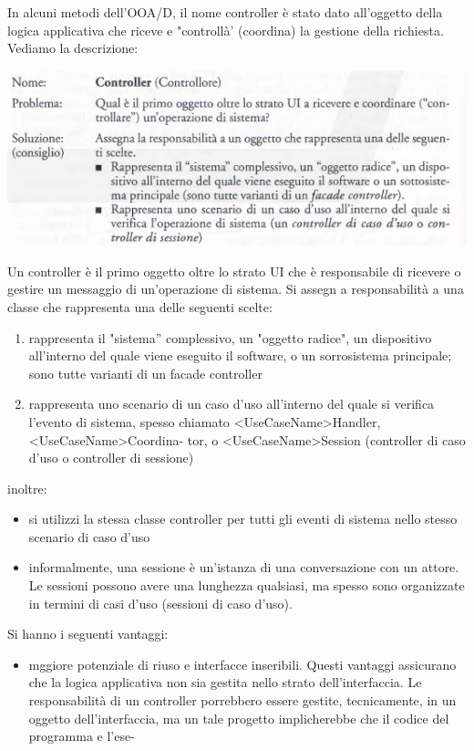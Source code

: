 \documentclass[a4paper,12pt, oneside]{book}
\begin{document}
\begin{enumerate}
In alcuni metodi dell'OOA/D, il nome controller è stato dato all'oggetto della logica
applicativa che riceve e "controllà' (coordina) la gestione della richiesta. Vediamo la descrizione:
\begin{center}
\includegraphics[scale = 0.7]{img/grasp11.png}
\end{center}
Un controller è il primo oggetto oltre lo strato UI che è responsabile di ricevere o gestire
un messaggio di un'operazione di sistema. Si assegn a responsabilità a una classe che rappresenta una delle seguenti scelte:
\begin{enumerate}
\item rappresenta il "sistema'' complessivo, un "oggetto radice", un dispositivo all'interno del quale viene eseguito il software, o un sorrosistema principale; sono tutte
varianti di un facade controller
\item rappresenta uno scenario di un caso d'uso all'interno del quale si verifica l'evento
di sistema, spesso chiamato <UseCaseName>Handler, <UseCaseName>Coordina-
tor, o <UseCaseName>Session (controller di caso d'uso o controller di sessione) 
\end{enumerate}
inoltre:
\begin{itemize}
\item si utilizzi la stessa classe controller per tutti gli eventi di sistema nello stesso
scenario di caso d'uso
\item informalmente, una sessione è un'istanza di una conversazione con un attore.
Le sessioni possono avere una lunghezza qualsiasi, ma spesso sono organizzate in
termini di casi d'uso (sessioni di caso d'uso).
\end{itemize}
Si hanno i seguenti vantaggi:
\begin{itemize}
\item mggiore potenziale di riuso e interfacce inseribili. Questi vantaggi assicurano
  che la logica applicativa non sia gestita nello strato dell'interfaccia. Le responsabilità
  di un controller porrebbero essere gestite, tecnicamente, in un oggetto dell'interfaccia, ma un tale progetto implicherebbe che il codice del programma e l'ese-

\end{itemize}
\end{enumerate}
\end{document}
